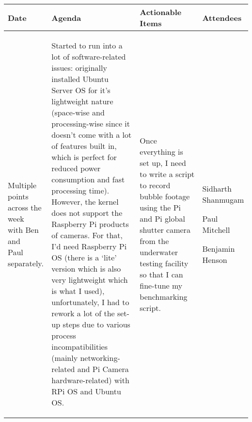 \begin{table}[!h]
    \centering
    \begin{tabularx}{\textwidth}{|l|X|X|X|}
        \hline
        Date & Agenda & Actionable Items & Attendees \\
        \hline
        \hline
        \makecell{Multiple points\\across the week\\with Ben and\\Paul separately.} & 
        \begin{myitemize}
            \item Started to run into a lot of software-related issues: originally installed Ubuntu Server OS for it's lightweight nature (space-wise and processing-wise since it doesn't come with a lot of features built in, which is perfect for reduced power consumption and fast processing time). However, the kernel does not support the Raspberry Pi products of cameras. For that, I'd need Raspberry Pi OS (there is a `lite' version which is also very lightweight which is what I used), unfortunately, I had to rework a lot of the set-up steps due to various process incompatibilities (mainly networking-related and Pi Camera hardware-related) with RPi OS and Ubuntu OS.
        \end{myitemize} & 
        \begin{myitemize}
            \item Once everything is set up, I need to write a script to record bubble footage using the Pi and Pi global shutter camera from the underwater testing facility so that I can fine-tune my benchmarking script.
        \end{myitemize} &
        \begin{myitemize}
            \item Sidharth Shanmugam
            \item Paul Mitchell
            \item Benjamin Henson
        \end{myitemize} \\
        \hline
    \end{tabularx}
\end{table}

\pagebreak

